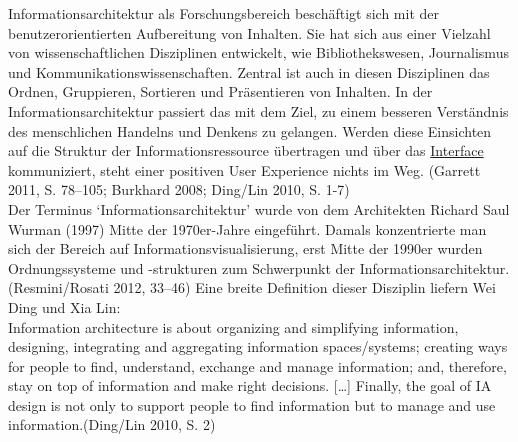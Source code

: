 \documentclass{article}
\begin{document}
        Informationsarchitektur als Forschungsbereich beschäftigt sich mit der
                  benutzerorientierten Aufbereitung von Inhalten. Sie hat sich aus einer Vielzahl
                  von wissenschaftlichen Disziplinen entwickelt, wie Bibliothekswesen, Journalismus
                  und Kommunikationswissenschaften. Zentral ist auch in diesen Disziplinen das
                  Ordnen, Gruppieren, Sortieren und Präsentieren von Inhalten. In der
                  Informationsarchitektur passiert das mit dem Ziel, zu einem besseren Verständnis
                  des menschlichen Handelns und Denkens zu gelangen. Werden diese Einsichten auf die
                  Struktur der Informationsressource übertragen und über das \href{http://gams.uni-graz.at/o:konde.98}{Interface} kommuniziert, steht einer positiven User
                  Experience nichts im Weg. (Garrett 2011, S. 78–105; Burkhard 2008; Ding/Lin
                     2010, S. 1-7)\\
            
        Der Terminus ‘Informationsarchitektur’ wurde von dem Architekten Richard Saul
                  Wurman (1997) Mitte der 1970er-Jahre eingeführt. Damals konzentrierte
                  man sich der Bereich auf Informationsvisualisierung, erst Mitte der 1990er wurden
                  Ordnungssysteme und -strukturen zum Schwerpunkt der Informationsarchitektur.
                     (Resmini/Rosati 2012, 33–46) Eine breite Definition dieser
                  Disziplin liefern Wei Ding und Xia Lin:\\
            
        Information architecture is about organizing and simplifying information,
                     designing, integrating and aggregating information spaces/systems; creating
                     ways for people to find, understand, exchange and manage information; and,
                     therefore, stay on top of information and make right decisions. […] Finally,
                     the goal of IA design is not only to support people to find information but to
                     manage and use information.(Ding/Lin 2010, S. 2)\\
            
\end{document}
